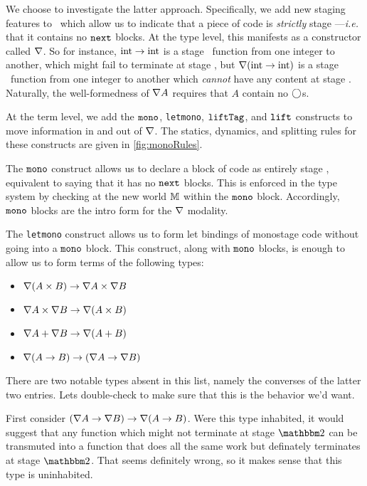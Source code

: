 \begin{concretesyntax}
We choose to investigate the latter approach.
Specifically, we add new staging features to \lang\ which allow us to indicate that a piece of code is {\em strictly} 
stage \bbone---{\em i.e.} that it contains no ${\tt next}$ blocks.
At the type level, this manifests as a constructor called $\nabla$.
So for instance, ${\rm int} \to {\rm int}$ is a stage \bbone\ function from one integer to another,
which might fail to terminate at stage \bbtwo,  
but $\nabla ({\rm int} \to {\rm int})$ is a stage \bbone\ function from one integer to another
which {\em cannot} have any content at stage \bbtwo.
Naturally, the well-formedness of $\nabla A$ requires that $A$ contain no $\bigcirc$s.

At the term level, we add the 
${\tt mono}$, \texttt{letmono}, ${\tt liftTag}$, and ${\tt lift}$ 
constructs to move information in and out of $\nabla$.  
The statics, dynamics, and splitting rules for these constructs are given in \cref{fig:monoRules}.

The ${\tt mono}$ construct allows us to declare a block of code as entirely stage \bbone,
equivalent to saying that it has no ${\tt next}$ blocks.
This is enforced in the type system by checking at the new world $\mathbb{M}$ within the ${\tt mono}$ block.
Accordingly, ${\tt mono}$ blocks are the intro form for the $\nabla$ modality. 

The \texttt{letmono} construct allows us to form let bindings of monostage code without going into a ${\tt mono}$ block.
This construct, along with ${\tt mono}$ blocks, is enough to allow us to form terms of the following types:
\begin{itemize}
\item $\nabla(A \times B) \to \nabla A \times \nabla B$ 
\item $\nabla A \times \nabla B \to \nabla(A \times B)$
\item $\nabla A + \nabla B \to \nabla(A + B)$
\item $\nabla(A \to B) \to (\nabla A \to \nabla B)$
\end{itemize}
There are two notable types absent in this list, namely the converses of the latter two entries.
Lets double-check to make sure that this is the behavior we'd want.

First consider $(\nabla A \to \nabla B) \to \nabla(A \to B)$.
Were this type inhabited, it would suggest that any function which might not terminate at stage $\bbtwo$
can be transmuted into a function that does all the same work but definately terminates at stage $\bbtwo$.
That seems definitely wrong, so it makes sense that this type is uninhabited.


\end{concretesyntax}
